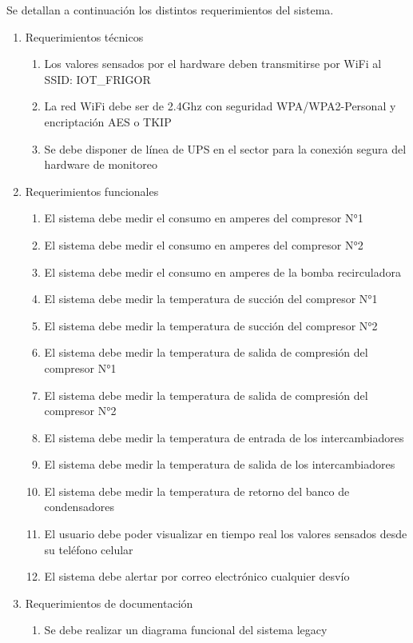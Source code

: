 \documentclass[
11pt, %
]{charter}
\begin{document}
Se detallan a continuación los distintos requerimientos del sistema.
\begin{enumerate}
	\item Requerimientos técnicos
		\begin{enumerate}
			\item Los valores sensados por el hardware deben transmitirse por WiFi al SSID: IOT\_FRIGOR
			\item La red WiFi debe ser de 2.4Ghz con seguridad WPA/WPA2-Personal y encriptación AES o TKIP
			\item Se debe disponer de línea de UPS en el sector para la conexión segura del hardware de monitoreo
		\end{enumerate}
	\item Requerimientos funcionales
		\begin{enumerate}
			\item El sistema debe medir el consumo en amperes del compresor N°1
			\item El sistema debe medir el consumo en amperes del compresor N°2
			\item El sistema debe medir el consumo en amperes de la bomba recirculadora
			\item El sistema debe medir la temperatura de succión del compresor N°1
			\item El sistema debe medir la temperatura de succión del compresor N°2
			\item El sistema debe medir la temperatura de salida de compresión del compresor N°1
			\item El sistema debe medir la temperatura de salida de compresión del compresor N°2
			\item El sistema debe medir la temperatura de entrada de los intercambiadores
			\item El sistema debe medir la temperatura de salida de los intercambiadores
			\item El sistema debe medir la temperatura de retorno del banco de condensadores
			\item El usuario debe poder visualizar en tiempo real los valores sensados desde su teléfono celular
			\item El sistema debe alertar por correo electrónico cualquier desvío
		\end{enumerate}
	\item Requerimientos de documentación
		\begin{enumerate}		
			\item Se debe realizar un diagrama funcional del sistema legacy

\end{enumerate}
\end{enumerate}
\end{document}
